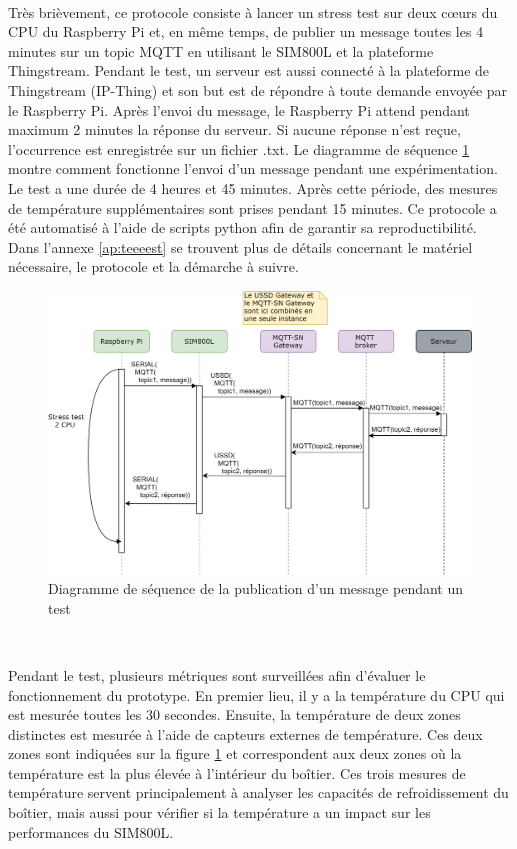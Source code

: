 ~

\noindent
Très brièvement, ce protocole consiste à lancer un stress test sur deux cœurs du CPU du Raspberry Pi et, en même temps, de publier un message toutes les 4 minutes sur un topic MQTT en utilisant le SIM800L et la plateforme Thingstream. Pendant le test, un serveur est aussi connecté à la plateforme de Thingstream (IP-Thing) et son but est de répondre à toute demande envoyée par le Raspberry Pi. Après l'envoi du message, le Raspberry Pi attend pendant maximum 2 minutes la réponse du serveur. Si aucune réponse n'est reçue, l'occurrence est enregistrée sur un fichier .txt. Le diagramme de séquence \ref{fig:dia_test} montre comment fonctionne l'envoi d'un message pendant une expérimentation. Le test a une durée de 4 heures et 45 minutes. Après cette période, des mesures de température supplémentaires sont prises pendant 15 minutes. Ce protocole a été automatisé à l'aide de scripts python afin de garantir sa reproductibilité. Dans l'annexe \ref{ap:teeeest} se trouvent plus de détails concernant le matériel nécessaire, le protocole et la démarche à suivre.

\begin{figure}[ht!]
  \includegraphics[width=\textwidth]{img/el_prototype/diagram_test.png}
  \caption{Diagramme de séquence de la publication d'un message pendant un test}
  \label{fig:dia_test}
\end{figure}


~

\vspace{-0.5cm}

\noindent
Pendant le test, plusieurs métriques sont surveillées afin d'évaluer le fonctionnement du prototype. En premier lieu, il y a la température du CPU qui est mesurée toutes les 30 secondes. Ensuite, la température de deux zones distinctes est mesurée à l'aide de capteurs externes de température. Ces deux zones sont indiquées sur la figure \ref{fig:dia_test} et correspondent aux deux zones où la température est la plus élevée à l'intérieur du boîtier. Ces trois mesures de température servent principalement à analyser les capacités de refroidissement du boîtier, mais aussi pour vérifier si la température a un impact sur les performances du SIM800L.

